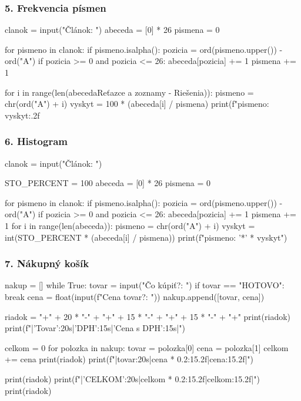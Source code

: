 \subsubsection*{5. Frekvencia písmen}
\begin{solution}
clanok = input("Článok: ")
abeceda = [0] * 26
pismena = 0

for pismeno in clanok:
    if pismeno.isalpha():
        pozicia = ord(pismeno.upper()) - ord("A")
        if pozicia >= 0 and pozicia <= 26:
            abeceda[pozicia] += 1
            pismena += 1

for i in range(len(abecedaReťazce a zoznamy - Riešenia)):
    pismeno = chr(ord("A") + i)
    vyskyt = 100 * (abeceda[i] / pismena)
    print(f"{pismeno}: {vyskyt:.2f}%
\end{solution}

\subsubsection*{6. Histogram}
\begin{solution}
clanok = input("Článok: ")

STO_PERCENT = 100
abeceda = [0] * 26
pismena = 0

for pismeno in clanok:
    if pismeno.isalpha():
        pozicia = ord(pismeno.upper()) - ord("A")
        if pozicia >= 0 and pozicia <= 26:
            abeceda[pozicia] += 1
            pismena += 1
for i in range(len(abeceda)):
	pismeno = chr(ord("A") + i)
	vyskyt = int(STO_PERCENT * (abeceda[i] / pismena))
	print(f"{pismeno}: {'*' * vyskyt}")
\end{solution}

\subsubsection*{7. Nákupný košík}
\begin{solution}
nakup = []
while True:
    tovar = input("Čo kúpiť?: ")
    if tovar == "HOTOVO":
        break
    cena = float(input(f"Cena {tovar}?: "))
    nakup.append([tovar, cena])

riadok = "+" + 20 * "-" + "+" + 15 * "-" + "+" + 15 * "-" + "+"
print(riadok)
print(f"|{'Tovar':20s}|{'DPH':15s}|{'Cena s DPH':15s}|")

celkom = 0
for polozka in nakup:
    tovar = polozka[0]
    cena = polozka[1]
    celkom += cena
    print(riadok)
    print(f"|{tovar:20s}|{cena * 0.2:15.2f}|{cena:15.2f}|")

print(riadok)
print(f"|{'CELKOM':20s}|{celkom * 0.2:15.2f}|{celkom:15.2f}|")
print(riadok)
\end{solution}


